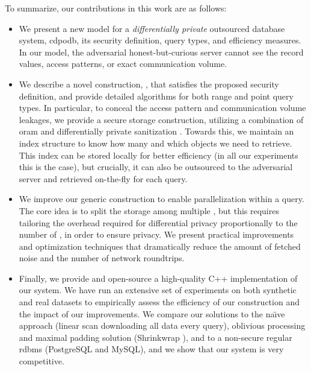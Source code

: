 	To summarize, our contributions in this work are as follows:
	\begin{itemize}
		\item
			We present a new model for a \emph{differentially private} outsourced database system, \acrshort{cdpodb}, its security definition, query types, and efficiency measures.
			In our model, the adversarial honest-but-curious server cannot see the record values, access patterns, or exact communication volume.

		\item
			We describe a novel construction, \epsolute{}, that satisfies the proposed security definition, and provide detailed algorithms for both range and point query types.
			In particular, to conceal the access pattern and communication volume leakages, we provide a secure storage construction, utilizing a combination of \acrlong{oram} \cite{oram-theory, oram-original} and differentially private sanitization \cite{non-interactive-database-privacy}.
			Towards this, we maintain an index structure to know how many and which objects we need to retrieve.
			This index can be stored locally for better efficiency (in all our experiments this is the case), but crucially, it can also be outsourced to the adversarial server and retrieved on-the-fly for each query.

		\item
			We improve our generic construction to enable parallelization within a query.
			The core idea is to split the storage among multiple , but this requires tailoring the overhead required for differential privacy proportionally to the number of , in order to ensure privacy.
			We present practical improvements and optimization techniques that dramatically reduce the amount of fetched noise and the number of network roundtrips.

		\item
			Finally, we provide and open-source a high-quality C++ implementation of our system.
			We have run an extensive set of experiments on both synthetic and real datasets to empirically assess the efficiency of our construction and the impact of our improvements.
			We compare our solutions to the na\"{\i}ve approach (linear scan downloading all data every query), oblivious processing and maximal padding solution (Shrinkwrap \cite{shrinkwrap}), and to a non-secure regular \acrshort{rdbms} (PostgreSQL and MySQL), and we show that our system is very competitive.
	\end{itemize}

